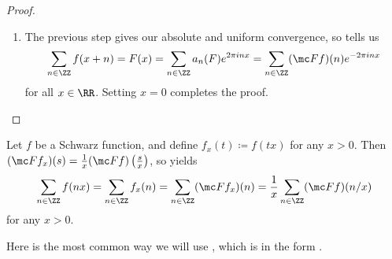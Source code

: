 \documentclass[../notes.tex]{subfiles}
\begin{document}
\begin{proof}
\begin{enumerate}
		\item The previous step gives our absolute and uniform convergence, so  tells us
		\[\sum_{n\in\ZZ}f(x+n)=F(x)=\sum_{n\in\ZZ}a_n(F)e^{2\pi inx}=\sum_{n\in\ZZ}(\mc Ff)(n)e^{-2\pi inx}\]
		for all $x\in\RR$. Setting $x=0$ completes the proof.
		\qedhere
	\end{enumerate}
\end{proof}
\begin{example} \label{ex:use-ps}
	Let $f$ be a Schwarz function, and define $f_x(t)\coloneqq f(tx)$ for any $x>0$. Then $(\mc Ff_x)(s)=\frac1x(\mc Ff)\left(\frac sx\right)$, so  yields
	\[\sum_{n\in\ZZ}f(nx)=\sum_{n\in\ZZ}f_x(n)=\sum_{n\in\ZZ}(\mc Ff_x)(n)=\frac1x\sum_{n\in\ZZ}(\mc Ff)(n/x)\]
	for any $x>0$.
\end{example}
Here is the most common way we will use , which is in the form .
\end{document}
